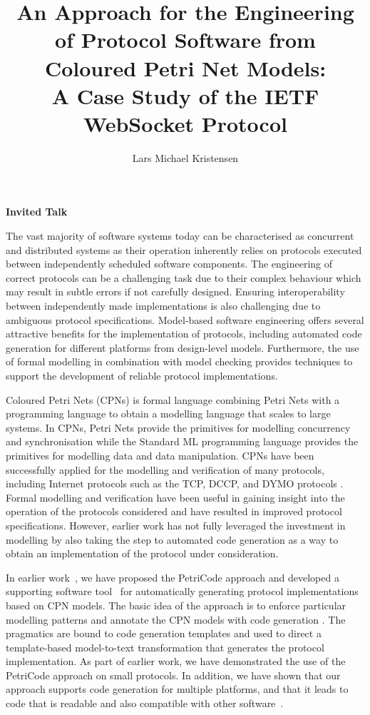 \documentclass[a4paper]{llncs}
\title{An Approach for the Engineering of Protocol Software from Coloured Petri Net Models: \\ A Case Study of the IETF WebSocket Protocol}
\author{Lars Michael Kristensen}
\institute{Department of Computing, Bergen University College, Norway
\\
Email: \email{lmkr@hib.no} 
}
\begin{document}
  
\maketitle

\begin{center}
{\textbf{Invited Talk}}
\end{center}

The vast majority of software systems today can be characterised as
concurrent and distributed systems as their operation inherently
relies on protocols executed between independently scheduled software
components. The engineering of correct protocols can
be a challenging task due to their complex behaviour which may result
in subtle errors if not carefully designed. Ensuring
interoperability between independently made implementations is also
challenging due to ambiguous protocol specifications.  Model-based
software engineering offers several attractive benefits for the
implementation of protocols, including automated code generation for
different platforms from design-level models. Furthermore, the use of
formal modelling in combination with model checking
provides techniques to support the development of reliable protocol
implementations.

Coloured Petri Nets (CPNs) \cite{CPNTOOLSPAPER} is formal language
combining Petri Nets with a programming language to obtain a modelling
language that scales to large systems. In CPNs, Petri Nets provide the
primitives for modelling concurrency and synchronisation while the
Standard ML programming language provides the primitives for modelling
data and data manipulation. CPNs have been successfully applied for
the modelling and verification of many protocols, including Internet
protocols such as the TCP, DCCP, and DYMO protocols
\cite{billington04,acpn2012}. Formal modelling and verification have
been useful in gaining insight into the operation of the protocols
considered and have resulted in improved protocol
specifications. However, earlier work has not fully leveraged the
investment in modelling by also taking the step to automated code
generation as a way to obtain an implementation of the protocol under
consideration.


In earlier work~\cite{SKK13-2}, we have proposed the PetriCode
approach and developed a supporting software
tool~\cite{petricodePaper} for automatically generating protocol
implementations based on CPN models.  The basic idea of the approach
is to enforce particular modelling patterns and annotate the CPN
models with code generation . The pragmatics are
bound to code generation templates and used to direct a template-based
model-to-text transformation that generates the protocol
implementation. As part of earlier work, we have demonstrated the use
of the PetriCode approach on small protocols. In addition, we have
shown that our approach supports code generation for multiple
platforms, and that it leads to code that is readable and also %
 compatible with other software~\cite{ecmfa14}.
\end{document}
